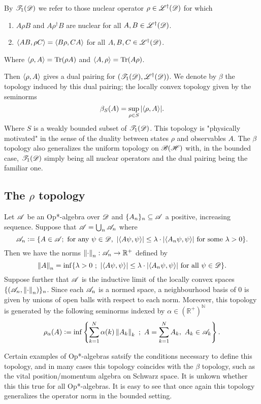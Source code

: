 \documentclass[../main.tex]{subfiles}
\begin{document}
\begin{definition}
	
By $\mathscr{T}_1(\mathscr{D})$ we refer to those nuclear operator $\rho \in \mathscr{L}^\dagger(\mathscr{\mathscr{D}})$ for which
\begin{enumerate}
	\item $A\rho B$ and $A \rho^\dagger B$ are nuclear for all $A, B \in \mathscr{L}^\dagger(\mathscr{\mathscr{D}})$.
	\item $\langle AB, \rho C \rangle = \langle B\rho, CA \rangle$ for all $A, B, C \in \mathscr{L}^\dagger(\mathscr{\mathscr{D}})$.
\end{enumerate}
Where $\langle \rho, A \rangle = \text{Tr}(\rho A)$ and $\langle A, \rho \rangle = \text{Tr}(A\rho)$.

\end{definition}

Then $\langle \rho, A \rangle$ gives a dual pairing for $(\mathscr{T}_1(\mathscr{D}), \mathscr{L}^\dagger(\mathscr{\mathscr{D}}))$. We denote by $\beta$ the topology 
induced by this dual pairing; the locally convex topology given by the seminorms \[\beta_S(A) = \sup_{\rho \in S} |\langle \rho, A \rangle|.\]
Where $S$ is a weakly bounded subset of $\mathscr{T}_1(\mathscr{D})$. This topology is "physically motivated" in the sense of the duality between
states $\rho$ and observables $A$. The $\beta$ topology also generalizes the uniform topology on $\mathscr{B}(\mathscr{H})$ with, in the bounded case, $\mathscr{T}_1(\mathscr{D})$
simply being all nuclear operators and the dual pairing being the familiar one. 

\subsection{The $\rho$ topology}

Let $\mathscr{A}$ be an Op*-algebra over $\mathscr{D}$ and $\{A_n\}_n \subseteq \mathscr{A}$
a positive, increasing sequence. Suppose that $\mathscr{A} = \bigcup_n \mathscr{A}_n$ where \[\mathscr{A}_n \vcentcolon= \{A \in \mathscr{A} ; \ \text{for any } \psi \in \mathscr{D} , \
|\langle A\psi, \psi \rangle| \le \lambda \cdot |\langle A_n\psi, \psi \rangle| \text{ for some } \lambda > 0\}.\] Then we have the norms $\left\lVert\cdot\right\rVert_{n}: \mathscr{A}_n \to \mathbb{R}^+$ defined by
\[\left\lVert A\right\rVert_n = \inf\{\lambda > 0 \ ; \ |\langle A\psi, \psi \rangle| \le \lambda\cdot|\langle A_n\psi, \psi \rangle| \text{ for all }\psi \in \mathscr{D}\}.\] Suppose further that $\mathscr{A}$ is the inductive
limit of the locally convex spaces $\{(\mathscr{A}_n, \left\lVert\cdot\right\rVert_n)\}_n$. Since each $\mathscr{A}_n$ is a normed space, a neighbourhood basis of $0$ is given by unions of open balls with respect to each norm. Moreover, this topology is generated
by the following seminorms indexed by $\alpha \in (\mathbb{R}^+)^{\mathbb{N}}$ \[\rho_\alpha(A) \defeq  \inf\left\{\sum^N_{k = 1}\alpha(k)\norm{A_k}_k \ ; \ A = \sum^N_{k = 1}A_k, \ 
A_k \in \ms{A}_k\right\}.\] 

Certain examples of Op*-algebras satsify the conditions necessary to define this topology, and in many cases this topology coincides with the $\beta$ topology, such as the vital
position/momentum algebra on Schwarz space. It is unkown whether this this true for all Op*-algebras. It is easy to see that once again this topology generalizes the operator norm
in the bounded setting.
\end{document}
